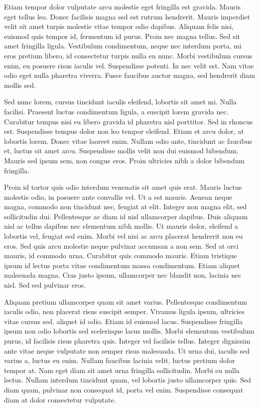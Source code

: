 \documentclass[a4paper]{article}
\begin{document}
Etiam tempor dolor vulputate arcu molestie eget fringilla est gravida. Mauris eget tellus leo. Donec facilisis magna sed est rutrum hendrerit. Mauris imperdiet velit sit amet turpis molestie vitae tempor odio dapibus. Aliquam felis nisi, euismod quis tempor id, fermentum id purus. Proin nec magna tellus. Sed sit amet fringilla ligula. Vestibulum condimentum, neque nec interdum porta, mi eros pretium libero, id consectetur turpis nulla eu nunc. Morbi vestibulum cursus enim, eu posuere risus iaculis vel. Suspendisse potenti. In nec velit est. Nam vitae odio eget nulla pharetra viverra. Fusce faucibus auctor magna, sed hendrerit diam mollis sed.

Sed nunc lorem, cursus tincidunt iaculis eleifend, lobortis sit amet mi. Nulla facilisi. Praesent luctus condimentum ligula, a suscipit lorem gravida nec. Curabitur tempus nisi eu libero gravida id pharetra nisl porttitor. Sed in rhoncus est. Suspendisse tempus dolor non leo tempor eleifend. Etiam et arcu dolor, at lobortis lorem. Donec vitae laoreet enim. Nullam odio ante, tincidunt ac faucibus et, luctus sit amet arcu. Suspendisse mollis velit non dui euismod bibendum. Mauris sed ipsum sem, non congue eros. Proin ultricies nibh a dolor bibendum fringilla.

Proin id tortor quis odio interdum venenatis sit amet quis erat. Mauris luctus molestie odio, in posuere ante convallis vel. Ut a est mauris. Aenean neque magna, commodo non tincidunt nec, feugiat at elit. Integer non magna elit, sed sollicitudin dui. Pellentesque ac diam id nisl ullamcorper dapibus. Duis aliquam nisl ac tellus dapibus nec elementum nibh mollis. Ut mauris dolor, eleifend a lobortis vel, feugiat sed enim. Morbi vel nisi ac arcu placerat hendrerit non eu eros. Sed quis arcu molestie neque pulvinar accumsan a non sem. Sed at orci mauris, id commodo urna. Curabitur quis commodo mauris. Etiam tristique ipsum id lectus porta vitae condimentum massa condimentum. Etiam aliquet malesuada magna. Cras justo ipsum, ullamcorper nec blandit non, lacinia nec nisl. Sed sed pulvinar eros.

Aliquam pretium ullamcorper quam sit amet varius. Pellentesque condimentum iaculis odio, non placerat risus suscipit semper. Vivamus ligula ipsum, ultricies vitae cursus sed, aliquet id odio. Etiam id euismod lacus. Suspendisse fringilla ipsum non odio lobortis sed scelerisque lacus mollis. Morbi elementum vestibulum purus, id facilisis risus pharetra quis. Integer vel facilisis tellus. Integer dignissim ante vitae neque vulputate non semper risus malesuada. Ut urna dui, iaculis sed varius a, luctus eu enim. Nullam faucibus lacinia velit, luctus pretium dolor tempor at. Nam eget diam sit amet urna fringilla sollicitudin. Morbi eu nulla lectus. Nullam interdum tincidunt quam, vel lobortis justo ullamcorper quis. Sed diam quam, pulvinar non consequat id, porta vel enim. Suspendisse consequat diam at dolor consectetur vulputate.
\end{document}
